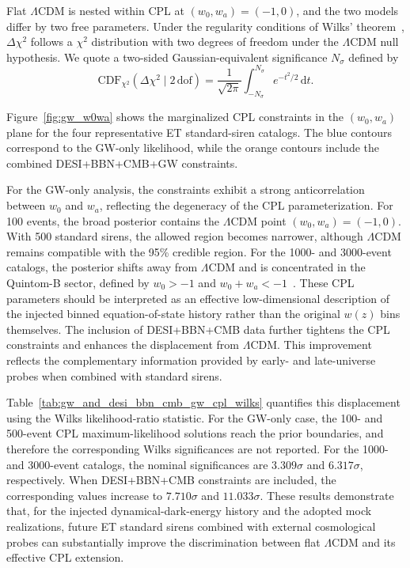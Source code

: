 \documentclass[
  aps,
  prd,
  twocolumn,
  nofootinbib,
  superscriptaddress,
  floatfix,
  longbibliography
]{revtex4-2}
\newcommand{\dd}{\mathrm{d}}
\newcommand{\LCDM}{\ensuremath{\Lambda\mathrm{CDM}}}
\begin{document}
Flat $\LCDM$ is nested within CPL at $(w_0,w_a)=(-1,0)$, and the two
models differ by two free parameters. Under the regularity conditions of
Wilks' theorem~\cite{Wilks1938}, $\Delta\chi^2$ follows a $\chi^2$
distribution with two degrees of freedom under the $\LCDM$ null
hypothesis. We quote a two-sided Gaussian-equivalent significance
$N_\sigma$ defined by
\begin{equation}
 \mathrm{CDF}_{\chi^2}\!\left(
 \Delta\chi^2\mid 2\,\mathrm{dof}
 \right)
 =
 \frac{1}{\sqrt{2\pi}}
 \int_{-N_\sigma}^{N_\sigma}
 e^{-t^2/2}\,\dd t.
 \label{eq:gaussian_equivalent_significance}
\end{equation}








Figure~\ref{fig:gw_w0wa} shows the marginalized CPL constraints in the
$(w_0,w_a)$ plane for the four representative ET standard-siren catalogs.
The blue contours correspond to the GW-only likelihood, while the orange
contours include the combined DESI+BBN+CMB+GW constraints.

For the GW-only analysis, the constraints exhibit a strong anticorrelation
between $w_0$ and $w_a$, reflecting the degeneracy of the CPL
parameterization. For 100 events, the broad posterior contains the
$\LCDM$ point $(w_0,w_a)=(-1,0)$. With 500 standard sirens, the allowed
region becomes narrower, although $\LCDM$ remains compatible with the
95\% credible region. For the 1000- and 3000-event catalogs, the posterior
shifts away from $\LCDM$ and is concentrated in the Quintom-B sector,
defined by $w_0>-1$ and $w_0+w_a<-1$~\cite{CaiQuintom2010}. These CPL
parameters should be interpreted as an effective low-dimensional
description of the injected binned equation-of-state history rather than
the original $w(z)$ bins themselves.
The inclusion of DESI+BBN+CMB data further tightens the CPL constraints
and enhances the displacement from $\LCDM$. This improvement reflects the
complementary information provided by early- and late-universe probes
when combined with standard sirens.

Table~\ref{tab:gw_and_desi_bbn_cmb_gw_cpl_wilks} quantifies this displacement using the
Wilks likelihood-ratio statistic. For the GW-only case, the 100- and
500-event CPL maximum-likelihood solutions reach the prior boundaries,
and therefore the corresponding Wilks significances are not reported.
For the 1000- and 3000-event catalogs, the nominal significances are
$3.309\sigma$ and $6.317\sigma$, respectively. When DESI+BBN+CMB
constraints are included, the corresponding values increase to
$7.710\sigma$ and $11.033\sigma$. These results demonstrate that, for
the injected dynamical-dark-energy history and the adopted mock
realizations, future ET standard sirens combined with external
cosmological probes can substantially improve the discrimination between
flat $\LCDM$ and its effective CPL extension.
\end{document}

